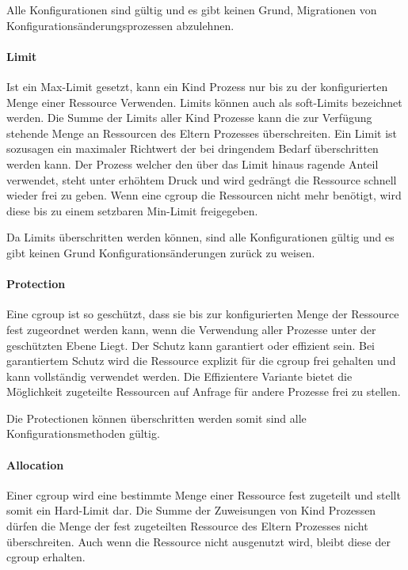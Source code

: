 \documentclass[12pt,a4paper,bibliography=totocnumbered,listof=totocnumbered]{scrartcl}
\begin{document}
Alle Konfigurationen sind gültig und es gibt keinen Grund, Migrationen von Konfigurationsänderungsprozessen abzulehnen.

\paragraph{Limit}
Ist ein Max-Limit gesetzt, kann ein Kind Prozess nur bis zu der konfigurierten Menge einer Ressource Verwenden. Limits können auch als soft-Limits bezeichnet werden. Die Summe der Limits aller Kind Prozesse kann die zur Verfügung stehende Menge an Ressourcen des Eltern Prozesses überschreiten. Ein Limit ist sozusagen ein maximaler Richtwert der bei dringendem Bedarf überschritten werden kann. Der Prozess welcher den über das Limit hinaus ragende Anteil verwendet, steht unter erhöhtem Druck und wird gedrängt die Ressource schnell wieder frei zu geben. Wenn eine cgroup die Ressourcen nicht mehr benötigt, wird diese bis zu einem setzbaren Min-Limit freigegeben.

Da Limits überschritten werden können, sind alle Konfigurationen gültig und es gibt keinen Grund Konfigurationsänderungen zurück zu weisen.

\paragraph{Protection}
Eine cgroup ist so geschützt, dass sie bis zur konfigurierten Menge der Ressource fest zugeordnet werden kann, wenn die Verwendung aller Prozesse unter der geschützten Ebene Liegt. Der Schutz kann garantiert oder effizient sein. Bei garantiertem Schutz wird die Ressource explizit für die cgroup frei gehalten und kann vollständig verwendet werden. Die Effizientere Variante bietet die Möglichkeit zugeteilte Ressourcen auf Anfrage für andere Prozesse frei zu stellen.

Die Protectionen können überschritten werden somit sind alle Konfigurationsmethoden gültig.

\paragraph{Allocation}
Einer cgroup wird eine bestimmte Menge einer Ressource fest zugeteilt und stellt somit ein Hard-Limit dar. Die Summe der Zuweisungen von Kind Prozessen dürfen die Menge der fest zugeteilten Ressource des Eltern Prozesses nicht überschreiten. Auch wenn die Ressource nicht ausgenutzt wird, bleibt diese der cgroup erhalten. 
\end{document}
